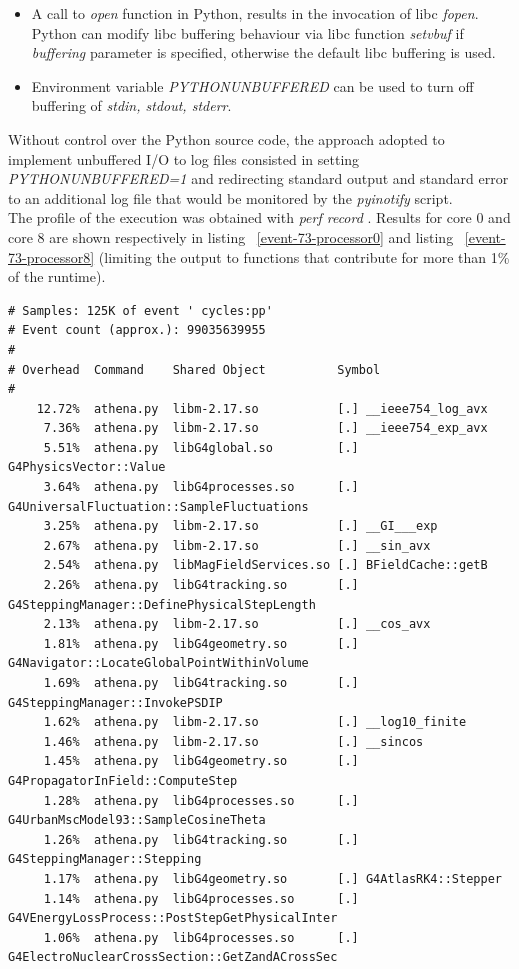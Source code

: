 \documentclass[a4paper]{jpconf}
\begin{document}
\begin{itemize}
\item A call to \textit{open} function in Python, results in the invocation
of libc \textit{fopen}. Python can modify libc buffering behaviour via libc 
function \textit{setvbuf} if \textit{buffering} parameter is specified, 
otherwise the default libc buffering is used. 
\item Environment variable \textit{PYTHONUNBUFFERED} can be used to turn off
buffering of \textit{stdin, stdout, stderr}.
\end{itemize}
Without control over the Python source code, the approach adopted to implement 
unbuffered I/O to log files consisted in setting 
\textit{PYTHONUNBUFFERED=1} and redirecting standard output and standard error 
to an additional log file that would be monitored by the \textit{pyinotify} script.
\\
The profile of the execution was obtained with \textit{perf record} . 
Results for core 0 
and core 8 are shown respectively in listing ~\ref{event-73-processor0} and 
listing ~\ref{event-73-processor8} (limiting the output to functions that
contribute for more than 1\% of the runtime). 

\begin{lstlisting}[caption=Recording of event 73 on core 0, label=event-73-processor0]
# Samples: 125K of event ' cycles:pp'
# Event count (approx.): 99035639955
#
# Overhead  Command    Shared Object          Symbol                                            
#
    12.72%  athena.py  libm-2.17.so           [.] __ieee754_log_avx
     7.36%  athena.py  libm-2.17.so           [.] __ieee754_exp_avx
     5.51%  athena.py  libG4global.so         [.] G4PhysicsVector::Value
     3.64%  athena.py  libG4processes.so      [.] G4UniversalFluctuation::SampleFluctuations
     3.25%  athena.py  libm-2.17.so           [.] __GI___exp
     2.67%  athena.py  libm-2.17.so           [.] __sin_avx
     2.54%  athena.py  libMagFieldServices.so [.] BFieldCache::getB
     2.26%  athena.py  libG4tracking.so       [.] G4SteppingManager::DefinePhysicalStepLength
     2.13%  athena.py  libm-2.17.so           [.] __cos_avx
     1.81%  athena.py  libG4geometry.so       [.] G4Navigator::LocateGlobalPointWithinVolume
     1.69%  athena.py  libG4tracking.so       [.] G4SteppingManager::InvokePSDIP
     1.62%  athena.py  libm-2.17.so           [.] __log10_finite
     1.46%  athena.py  libm-2.17.so           [.] __sincos
     1.45%  athena.py  libG4geometry.so       [.] G4PropagatorInField::ComputeStep
     1.28%  athena.py  libG4processes.so      [.] G4UrbanMscModel93::SampleCosineTheta
     1.26%  athena.py  libG4tracking.so       [.] G4SteppingManager::Stepping
     1.17%  athena.py  libG4geometry.so       [.] G4AtlasRK4::Stepper
     1.14%  athena.py  libG4processes.so      [.] G4VEnergyLossProcess::PostStepGetPhysicalInter
     1.06%  athena.py  libG4processes.so      [.] G4ElectroNuclearCrossSection::GetZandACrossSec
\end{lstlisting}
\end{document}

